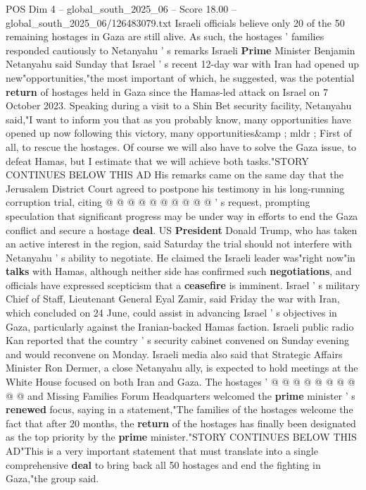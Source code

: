 \begin{textsample}{POS Dim 4 – global\_south\_2025\_06 – Score 18.00 – global\_south\_2025\_06/126483079.txt}  \label{ex:f4_pos_359}
Israeli officials believe only 20 of the 50 remaining hostages in Gaza are still alive.
As such, the hostages ' families responded cautiously to Netanyahu ' s remarks Israeli \textbf{Prime} Minister Benjamin Netanyahu said Sunday that Israel ' s recent 12-day war with Iran had opened up new"opportunities,"the most important of which, he suggested, was the potential \textbf{return} of hostages held in Gaza since the Hamas-led attack on Israel on 7 October 2023.
Speaking during a visit to a Shin Bet security facility, Netanyahu said,"I want to inform you that as you probably know, many opportunities have opened up now following this victory, many opportunities\&amp ; mldr ; First of all, to rescue the hostages.
Of course we will also have to solve the Gaza issue, to defeat Hamas, but I estimate that we will achieve both tasks."STORY CONTINUES BELOW THIS AD His remarks came on the same day that the Jerusalem District Court agreed to postpone his testimony in his long-running corruption trial, citing @ @ @ @ @ @ @ @ @ @ ' s request, prompting speculation that significant progress may be under way in efforts to end the Gaza conflict and secure a hostage \textbf{deal}.
US \textbf{President} Donald Trump, who has taken an active interest in the region, said Saturday the trial should not interfere with Netanyahu ' s ability to negotiate.
He claimed the Israeli leader was"right now"in \textbf{talks} with Hamas, although neither side has confirmed such \textbf{negotiations}, and officials have expressed scepticism that a \textbf{ceasefire} is imminent.
Israel ' s military Chief of Staff, Lieutenant General Eyal Zamir, said Friday the war with Iran, which concluded on 24 June, could assist in advancing Israel ' s objectives in Gaza, particularly against the Iranian-backed Hamas faction.
Israeli public radio Kan reported that the country ' s security cabinet convened on Sunday evening and would reconvene on Monday.
Israeli media also said that Strategic Affairs Minister Ron Dermer, a close Netanyahu ally, is expected to hold meetings at the White House focused on both Iran and Gaza.
The hostages ' @ @ @ @ @ @ @ @ @ @ and Missing Families Forum Headquarters welcomed the \textbf{prime} minister ' s \textbf{renewed} focus, saying in a statement,"The families of the hostages welcome the fact that after 20 months, the \textbf{return} of the hostages has finally been designated as the top priority by the \textbf{prime} minister."STORY CONTINUES BELOW THIS AD"This is a very important statement that must translate into a single comprehensive \textbf{deal} to bring back all 50 hostages and end the fighting in Gaza,"the group said.

\end{textsample}
